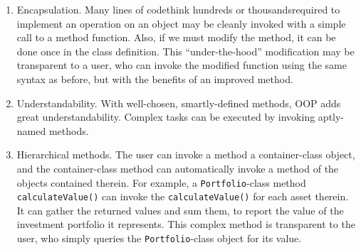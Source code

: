 \begin{enumerate}
\item Encapsulation. Many lines of code\textemdash think hundreds or thousands\textemdash required to implement an operation on an object may be cleanly invoked with a simple call to a method function. Also, if we must modify the method, it can be done once in the class definition. This ``under-the-hood'' modification may be transparent to a user, who can invoke the modified function using the same syntax as before, but with the benefits of an improved method.

\item Understandability. With well-chosen, smartly-defined methods, OOP adds great understandability. Complex tasks can be executed by invoking aptly-named methods.

\item Hierarchical methods. The user can invoke a method a container-class object, and the container-class method can automatically invoke a method of the objects contained therein. For example, a \texttt{Portfolio}-class method \texttt{calculateValue()} can invoke the \texttt{calculateValue()} for each asset therein. It can gather the returned values and sum them, to report the value of the investment portfolio it represents. This complex method is transparent to the user, who simply queries the \texttt{Portfolio}-class object for its value.
\end{enumerate}
